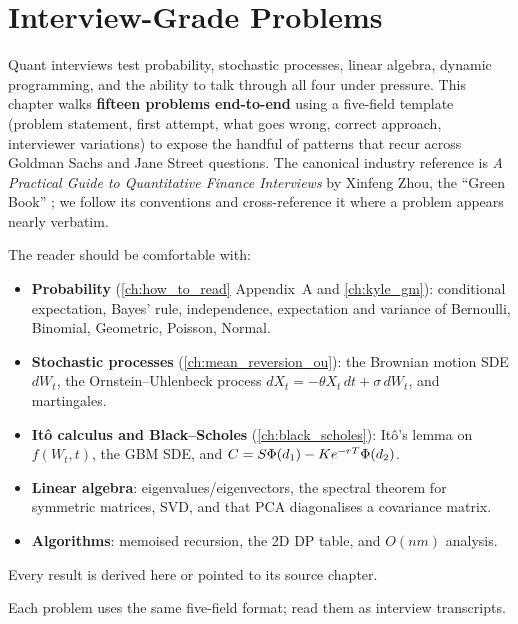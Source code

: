 \chapter{Interview-Grade Problems}
\label{ch:interview_problems}

Quant interviews test probability, stochastic processes, linear
algebra, dynamic programming, and the ability to talk through all
four under pressure.  This chapter walks \textbf{fifteen problems
end-to-end} using a five-field template (problem statement,
first attempt, what goes wrong, correct approach, interviewer
variations) to expose the handful of patterns that recur across
Goldman Sachs and Jane Street questions.  The canonical industry
reference is \emph{A Practical Guide to Quantitative Finance
Interviews} by Xinfeng Zhou, the ``Green Book''
\citeGreenBook; we follow its conventions and cross-reference it
where a problem appears nearly verbatim.

\begin{backgroundbox}[Prerequisites]
The reader should be comfortable with:
\begin{itemize}
  \item \textbf{Probability} (\cref{ch:how_to_read}
    Appendix~A and \cref{ch:kyle_gm}):
    conditional expectation, Bayes' rule, independence, expectation
    and variance of Bernoulli, Binomial, Geometric, Poisson, Normal.
  \item \textbf{Stochastic processes} (\cref{ch:mean_reversion_ou}):
    the Brownian motion SDE $dW_t$, the Ornstein--Uhlenbeck process
    $dX_t = -\theta X_t\,dt + \sigma\,dW_t$, and martingales.
  \item \textbf{It\^o calculus and Black--Scholes}
    (\cref{ch:black_scholes}): It\^o's lemma on $f(W_t, t)$, the
    GBM SDE, and $C = S\Phi(d_1) - K e^{-rT}\Phi(d_2)$.
  \item \textbf{Linear algebra}: eigenvalues/eigenvectors, the
    spectral theorem for symmetric matrices, SVD, and that PCA
    diagonalises a covariance matrix.
  \item \textbf{Algorithms}: memoised recursion, the 2D DP table,
    and $O(nm)$ analysis.
\end{itemize}
Every result is derived here or pointed to its source chapter.
\end{backgroundbox}

Each problem uses the same five-field format; read them as
interview transcripts.

